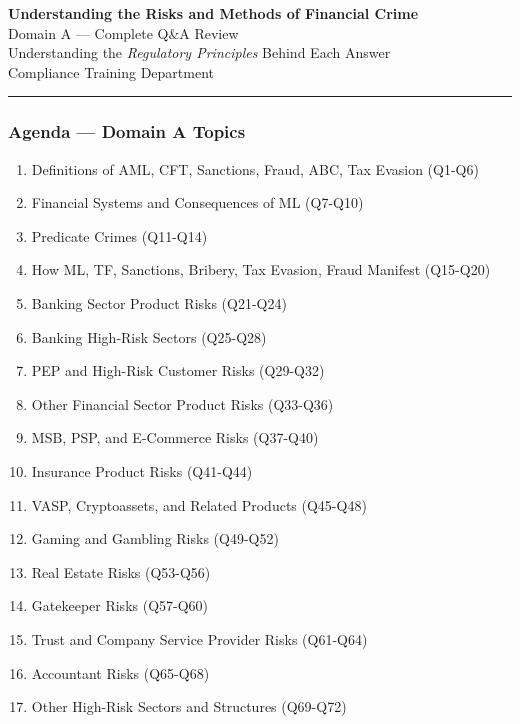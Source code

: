 \documentclass[12pt,aspectratio=169]{beamer}
\renewcommand{\scriptsize}{\fontsize{5}{6}\selectfont}
\begin{document}
	
	\begin{frame}
		\centering
		\vspace{0.8cm}
		{\fontsize{16}{19}\selectfont \textbf{Understanding the Risks and Methods of Financial Crime}}\\[0.15cm]
		{\fontsize{12}{14}\selectfont Domain A — Complete Q\&A Review}\\[0.3cm]
		{\fontsize{9}{11}\selectfont Understanding the \textit{Regulatory Principles} Behind Each Answer}\\[0.3cm]
		{\fontsize{8}{10}\selectfont Compliance Training Department}
		\vspace{0.2cm}
		\rule{4cm}{0.5pt}
	\end{frame}
	
	\begin{frame}
		\frametitle{\fontsize{11}{13}\selectfont Agenda — Domain A Topics}
		\scriptsize
		\begin{enumerate}
			\item Definitions of AML, CFT, Sanctions, Fraud, ABC, Tax Evasion (Q1-Q6)
			\item Financial Systems and Consequences of ML (Q7-Q10)
			\item Predicate Crimes (Q11-Q14)
			\item How ML, TF, Sanctions, Bribery, Tax Evasion, Fraud Manifest (Q15-Q20)
			\item Banking Sector Product Risks (Q21-Q24)
			\item Banking High-Risk Sectors (Q25-Q28)
			\item PEP and High-Risk Customer Risks (Q29-Q32)
			\item Other Financial Sector Product Risks (Q33-Q36)
			\item MSB, PSP, and E-Commerce Risks (Q37-Q40)
			\item Insurance Product Risks (Q41-Q44)
			\item VASP, Cryptoassets, and Related Products (Q45-Q48)
			\item Gaming and Gambling Risks (Q49-Q52)
			\item Real Estate Risks (Q53-Q56)
			\item Gatekeeper Risks (Q57-Q60)
			\item Trust and Company Service Provider Risks (Q61-Q64)
			\item Accountant Risks (Q65-Q68)
			\item Other High-Risk Sectors and Structures (Q69-Q72)
		\end{enumerate}
	\end{frame}
	
\end{document}

